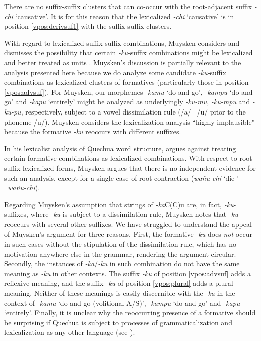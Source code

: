 \documentclass[output=paper]{langscibook}
\begin{document}
There are no suffix-suffix clusters that can co-occur with the root-adjacent suffix \textit{-chi} `causative'. It is for this reason that the lexicalized \textit{-chi} `causative' is in position \ref{vpos:derivsuf1} with the suffix-suffix clusters.

With regard to lexicalized suffix-suffix combinations, Muysken considers and dismisses the possibility that certain \textit{-ku}-suffix combinations might be lexicalized and better treated as units \citep[298]{muysken:1981}. Muysken's discussion is partially relevant to the analysis presented here because we do analyze some candidate \textit{-ku-}suffix combinations as lexicalized clusters of formatives (particularly those in position \ref{vpos:advsuf}). For Muysken, our morphemes \textit{-kamu} `do and go', \textit{-kampu} `do and go' and \textit{-kapu} `entirely' might be analyzed as underlyingly \textit{-ku-mu}, \textit{-ku-mpu} and \textit{-ku-pu}, respectively, subject to a vowel dissimilation rule (/a/ \rightarrow /u/ prior to the phoneme /u/). Muysken considers the lexicalization analysis ``highly implausible" because the formative \textit{-ku} reoccurs with different suffixes.

In his lexicalist analysis of Quechua word structure, \citet[297--298]{muysken:1981} argues against treating certain formative combinations as lexicalized combinations. With respect to root-suffix lexicalized forms, Muysken argues that there is no independent evidence for such an analysis, except for a single case of root contraction (\textit{wañu-chi} `die-\Caus{}' \rightarrow \textit{wañu-chi}). 

Regarding Muysken's assumption that strings of \textit{-ka}C(C)u are, in fact, \textit{-ku}-suffixes, where \textit{-ku} is subject to a dissimilation rule, Muysken notes that \textit{-ku} reoccurs with several other suffixes. We have struggled to understand the appeal of Muysken's argument for three reasons. First, the formative \textit{-ku} does \textit{not} occur in such cases without the stipulation of the dissimilation rule, which has no motivation anywhere else in the grammar, rendering the argument circular. Secondly, the instances of \textit{-ka}/\textit{-ku} in such combination do not have the same meaning as \textit{-ku} in other contexts. The suffix \textit{-ku} of position \ref{vpos:advsuf} adds a reflexive meaning, and the suffix \textit{-ku} of position \ref{vpos:plural} adds a plural meaning. Neither of these meanings is easily discernible with the \textit{-ka} in the context of \textit{-kamu} `do and go (volitional A/S)', \textit{-kampu} `do and go' and \textit{-kapu} `entirely'. Finally, it is unclear why  the reoccurring presence of a formative should be surprising if Quechua is subject to processes of grammaticalization and lexicalization as any other language (see \citealt{Reuse1994}).
\end{document}

